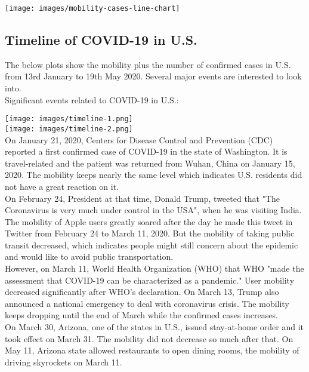 \texttt{[image: images/mobility-cases-line-chart]}

\subsection{Timeline of COVID-19 in U.S.}
The below plots show the mobility plus the number of confirmed cases in U.S. from 13rd January to 19th May 2020. Several major events are interested to look into. \\

Significant events related to COVID-19 in U.S.:

\texttt{[image: images/timeline-1.png]}\\
\texttt{[image: images/timeline-2.png]}\\

On January 21, 2020, Centers for Disease Control and Prevention (CDC) reported a first confirmed case of COVID-19 in the state of Washington. It is travel-related and the patient was returned from Wuhan, China on January 15, 2020. The mobility keeps nearly the same level which indicates U.S. residents did not have a great reaction on it. \\

On February 24, President at that time, Donald Trump, tweeted that "The Coronavirus is very much under control in the USA", when he was visiting India. The mobility of Apple users greatly soared after the day he made this tweet in Twitter from February 24 to March 11, 2020. But the mobility of taking public transit decreased, which indicates people might still concern about the epidemic and would like to avoid public transportation. \\

However, on March 11, World Health Organization (WHO) that WHO "made the assessment that COVID-19 can be characterized as a pandemic." User mobility decreased significantly after WHO's declaration. On March 13, Trump also announced a national emergency to deal with coronavirus crisis. The mobility keeps dropping until the end of March while the confirmed cases increases.\\

On March 30, Arizona, one of the states in U.S., issued stay-at-home order and it took effect on March 31. The mobility did not decrease so much after that. On May 11, Arizona state allowed restaurants to open dining rooms, the mobility of driving skyrockets on March 11.

